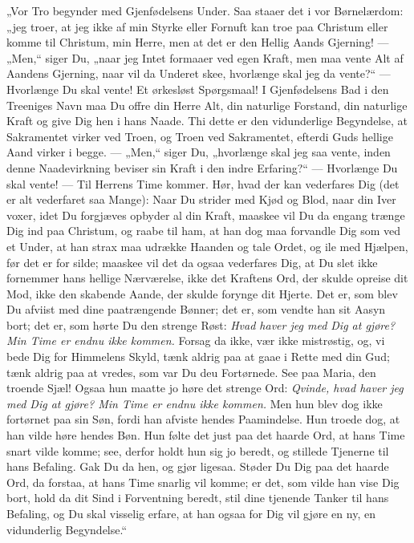 \documentclass[12pt,a4paper]{book}
\begin{document}
„Vor Tro begynder med Gjenfødelsens Under. Saa staaer det i vor Børnelærdom: „jeg troer, at
jeg ikke af min Styrke eller Fornuft kan troe paa Christum eller komme til Christum, min
Herre, men at det er den Hellig Aands Gjerning! --- „Men,“ siger Du, „naar jeg Intet
formaaer ved egen Kraft, men maa vente Alt af Aandens Gjerning, naar vil da Underet skee,
hvorlænge skal jeg da vente?“ --- Hvorlænge Du skal vente! Et ørkesløst Spørgsmaal! I
Gjenfødelsens Bad i den Treeniges Navn maa Du offre din Herre Alt, din naturlige Forstand,
din naturlige Kraft og give Dig hen i hans Naade. Thi dette er den vidunderlige Begyndelse,
at Sakramentet virker ved Troen, og Troen ved Sakramentet, efterdi Guds hellige Aand virker
i begge. --- „Men,“ siger Du, „hvorlænge skal jeg saa vente, inden denne Naadevirkning
beviser sin Kraft i den indre Erfaring?“ --- Hvorlænge Du skal vente! --- Til Herrens Time
kommer. Hør, hvad der kan vederfares Dig (det er alt vederfaret saa Mange): Naar Du strider
med Kjød og Blod, naar din Iver voxer, idet Du forgjæves opbyder al din Kraft, maaskee vil
Du da engang trænge Dig ind paa Christum, og raabe til ham, at han dog maa forvandle Dig
som ved et Under, at han strax
maa udrække Haanden og tale Ordet, og ile med Hjælpen, før det er for silde; maaskee vil
det da ogsaa vederfares Dig, at Du slet ikke fornemmer hans hellige Nærværelse, ikke det
Kraftens Ord, der skulde opreise dit Mod, ikke den skabende Aande, der skulde forynge dit
Hjerte. Det er, som blev Du afviist med dine paatrængende Bønner; det er, som vendte han
sit Aasyn bort; det er, som hørte Du den strenge Røst: \emph{Hvad haver jeg med Dig at
gjøre? Min Time er endnu ikke kommen.} Forsag da ikke, vær ikke mistrøstig, og, vi bede Dig
for Himmelens Skyld, tænk aldrig paa at gaae i Rette med din Gud; tænk aldrig paa at
vredes, som var Du deu Fortørnede. See paa Maria, den troende Sjæl! Ogsaa hun maatte jo
høre det strenge Ord: \emph{Qvinde, hvad haver jeg med Dig at gjøre? Min Time er endnu ikke
kommen.} Men hun blev dog ikke fortørnet paa sin Søn, fordi han afviste hendes
Paamindelse. Hun troede dog, at han vilde høre hendes Bøn. Hun følte det just paa det
haarde Ord, at hans Time snart vilde komme; see, derfor holdt hun sig jo beredt, og
stillede Tjenerne til hans Befaling. Gak Du da hen, og gjør ligesaa. Støder Du Dig paa det
haarde Ord, da forstaa, at hans Time snarlig vil komme; er det, som vilde han vise Dig
bort, hold da dit Sind i Forventning beredt, stil dine tjenende Tanker til hans Befaling,
og Du skal visselig erfare, at han ogsaa for Dig vil gjøre en ny, en vidunderlig
Begyndelse.“
\end{document}
